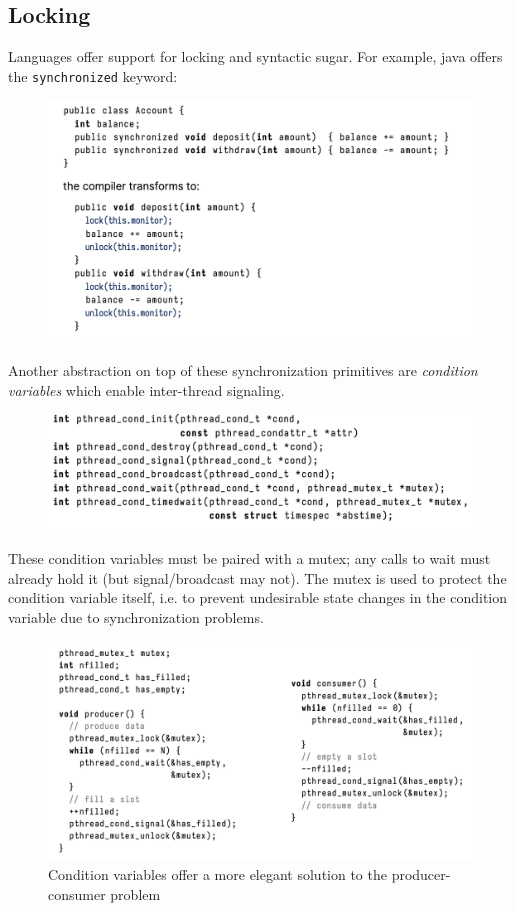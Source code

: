 \documentclass[../notes.tex]{subfiles}
\begin{document}
\subsection{Locking}

Languages offer support for locking and syntactic sugar. For example, java offers the \texttt{synchronized} keyword:

\begin{figure}[H]
    \centering
    \includegraphics[width=0.8\linewidth]{img/image_2023-03-08-14-37-02.png}
\end{figure}

Another abstraction on top of these synchronization primitives are \textit{condition variables} which enable inter-thread signaling.
\begin{figure}[H]
    \centering
    \includegraphics[width=0.8\linewidth]{img/image_2023-03-08-14-38-47.png}
\end{figure}

These condition variables must be paired with a mutex; any calls to wait must already hold it (but signal/broadcast may not).
The mutex is used to protect the condition variable itself, i.e. to prevent undesirable state changes in the condition variable due to synchronization problems.

\begin{figure}[H]
    \centering
    \includegraphics[width=0.8\linewidth]{img/image_2023-03-08-14-44-09.png}
    \caption{Condition variables offer a more elegant solution to the producer-consumer problem}
\end{figure}
\end{document}
